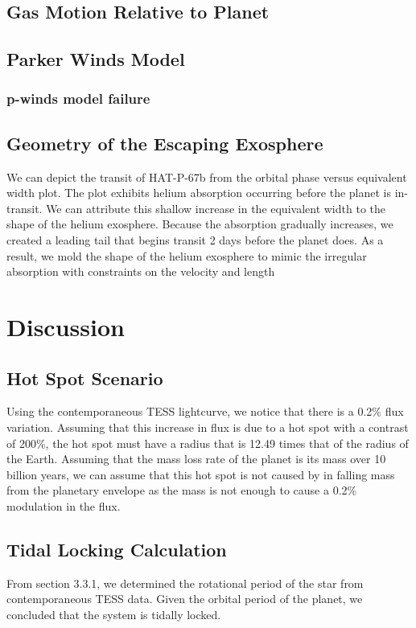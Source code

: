 \documentclass[twocolumn]{aastex631}
\begin{document}
\subsection{Gas Motion Relative to Planet}
\subsection{Parker Winds Model}
\subsubsection{p-winds model failure}
\subsection{Geometry of the Escaping Exosphere}
We can depict the transit of HAT-P-67b from the orbital phase versus equivalent width plot. The plot exhibits helium absorption occurring before the planet is in-transit. We can attribute this shallow increase in the equivalent width to the shape of the helium exosphere. Because the absorption gradually increases, we created a leading tail that begins transit 2 days before the planet does. As a result, we mold the shape of the helium exosphere to mimic the irregular absorption with constraints on the velocity and length

\section{Discussion}
\subsection{Hot Spot Scenario}
Using the contemporaneous TESS lightcurve, we notice that there is a 0.2\% flux variation. Assuming that this increase in flux is due to a hot spot with a contrast of 200\%, the hot spot must have a radius that is 12.49 times that of the radius of the Earth. Assuming that the mass loss rate of the planet is its mass over 10 billion years, we can assume that this hot spot is not caused by in falling mass from the planetary envelope as the mass is not enough to cause a 0.2\% modulation in the flux.

\subsection{Tidal Locking Calculation}
From section 3.3.1, we determined the rotational period of the star from contemporaneous TESS data. Given the orbital period of the planet, we concluded that the system is tidally locked.
\end{document}
